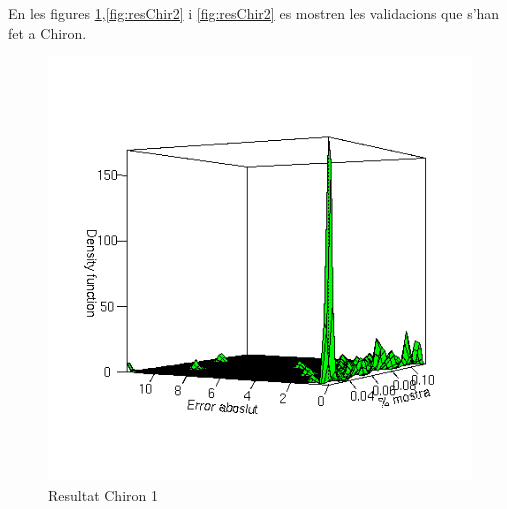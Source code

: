 


	En les figures \ref{fig:resChir1},\ref{fig:resChir2} i \ref{fig:resChir2} es
	mostren les validacions que s'han fet a Chiron.  


	\begin{figure}[tbp]
		\begin{center}
			\includegraphics[scale=0.75]{chiron/rgrau1.png}
		\end{center}
		\caption{Resultat Chiron 1}
		\label{fig:resChir1}
	\end{figure}

